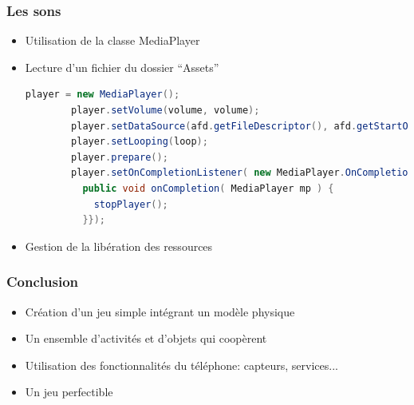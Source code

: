 \documentclass[handout]{beamer}
\begin{document}
\begin{frame}[fragile]
  \frametitle<1->{Les sons}
    \begin{itemize}%
    \item <1->{Utilisation de la classe MediaPlayer}%
    \item <2->{Lecture d'un fichier du dossier \enquote{Assets}}%
      \begin{lstlisting}[language=java]
        player = new MediaPlayer();
        player.setVolume(volume, volume);
        player.setDataSource(afd.getFileDescriptor(), afd.getStartOffset(), afd.getLength());
        player.setLooping(loop);
        player.prepare();
        player.setOnCompletionListener( new MediaPlayer.OnCompletionListener() {
          public void onCompletion( MediaPlayer mp ) {
            stopPlayer();
          }});
      \end{lstlisting} %
    \item <2->{Gestion de la libération des ressources} %
   \end{itemize}
\end{frame}

\begin{frame}
  \frametitle<1->{Conclusion}
    \begin{itemize}
      \item <1->{Création d'un jeu simple intégrant un modèle physique}%
      \item <2->{Un ensemble d'activités et d'objets qui coopèrent}%
      \item <3->{Utilisation des fonctionnalités du téléphone: capteurs, services...}%
      \item <4->{Un jeu perfectible}%
   \end{itemize}
\end{frame}
\end{document}

